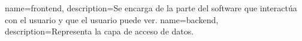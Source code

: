 {
    name=frontend,
    description={Se encarga de la parte del software que interactúa con el usuario y que el usuario puede ver.}
}
{
    name=backend,
    description={Representa la capa de acceso de datos.}
}

 
